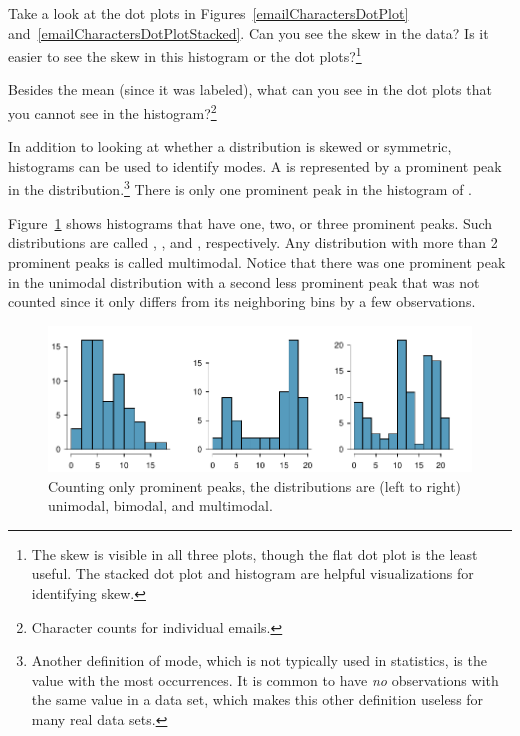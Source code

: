 \begin{exercise}
Take a look at the dot plots in Figures~\ref{emailCharactersDotPlot} and~\ref{emailCharactersDotPlotStacked}. Can you see the skew in the data? Is it easier to see the skew in this histogram or the dot plots?\footnote{The skew is visible in all three plots, though the flat dot plot is the least useful. The stacked dot plot and histogram are helpful visualizations for identifying skew.}
\end{exercise}

\begin{exercise}
Besides the mean (since it was labeled), what can you see in the dot plots that you cannot see in the histogram?\footnote{Character counts for individual emails.}
\end{exercise}

In addition to looking at whether a distribution is skewed or symmetric, histograms can be used to identify modes. A  is represented by a prominent peak in the distribution.\footnote{Another definition of mode, which is not typically used in statistics, is the value with the most occurrences. It is common to have \emph{no} observations with the same value in a data set, which makes this other definition useless for many real data sets.} There is only one prominent peak in the histogram of .

Figure~\ref{singleBiMultiModalPlots} shows histograms that have one, two, or three prominent peaks. Such distributions are called , , and , respectively. Any distribution with more than 2 prominent peaks is called multimodal. Notice that there was one prominent peak in the unimodal distribution with a second less prominent peak that was not counted since it only differs from its neighboring bins by a few observations.

\begin{figure}[h]
   \centering
   \includegraphics[width=\textwidth]{ch_intro_to_data/figures/singleBiMultiModalPlots/singleBiMultiModalPlots}
   \caption{Counting only prominent peaks, the distributions are (left to right) unimodal, bimodal, and multimodal.}
   \label{singleBiMultiModalPlots}
\end{figure}

